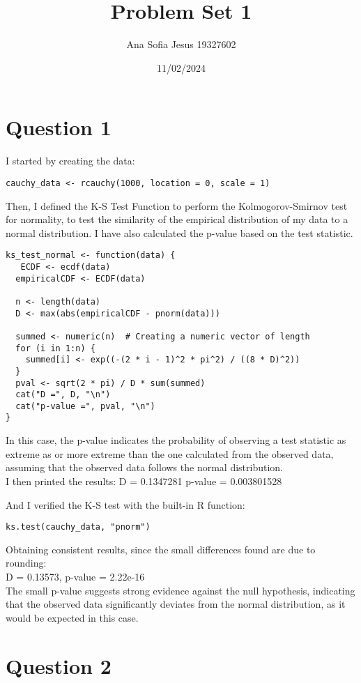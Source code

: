 \documentclass[oneside]{article}
\title{Problem Set 1}
\author{Ana Sofia Jesus 19327602}
\date{11/02/2024}
\begin{document}
\maketitle

\section*{Question 1}
I started by creating the data: 
\begin{verbatim}
cauchy_data <- rcauchy(1000, location = 0, scale = 1)
\end{verbatim}
\noindent
Then, I defined the K-S Test Function to perform the Kolmogorov-Smirnov test for normality, to test the similarity of the empirical distribution of my data to a normal distribution. 
I have also calculated the p-value based on the test statistic.

\begin{verbatim}
ks_test_normal <- function(data) {
   ECDF <- ecdf(data)
  empiricalCDF <- ECDF(data)
  
  n <- length(data)
  D <- max(abs(empiricalCDF - pnorm(data)))
  
  summed <- numeric(n)  # Creating a numeric vector of length
  for (i in 1:n) {
    summed[i] <- exp((-(2 * i - 1)^2 * pi^2) / ((8 * D)^2))
  }
  pval <- sqrt(2 * pi) / D * sum(summed)
  cat("D =", D, "\n")
  cat("p-value =", pval, "\n")
}
\end{verbatim} 
\noindent
In this case, the p-value indicates the probability of observing a test statistic as extreme as or more extreme than the one calculated from the observed data, assuming that the observed data follows the normal distribution.
\\
I then printed the results:
D = 0.1347281 
p-value = 0.003801528 

\noindent
And I verified the K-S test with the built-in R function:
\begin{verbatim}
ks.test(cauchy_data, "pnorm")    
\end{verbatim}
\noindent
Obtaining consistent results, since the small differences found are due to rounding:
\\
D = 0.13573, p-value = 2.22e-16
\\
\noindent
The small p-value suggests strong evidence against the null hypothesis, indicating that the observed data significantly deviates from the normal distribution, as it would be expected in this case.


\section*{Question 2}
\end{document}
